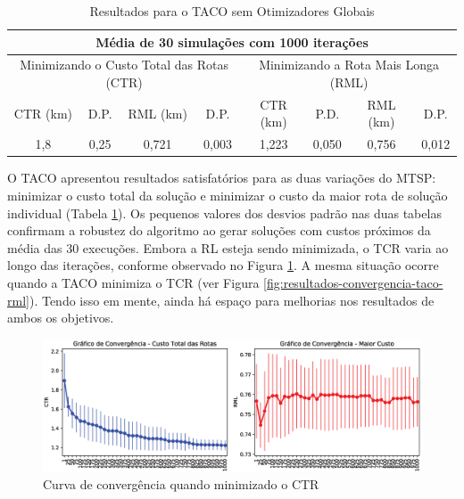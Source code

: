 \begin{table}[htb]
    \centering
    \caption{Resultados para o TACO sem Otimizadores Globais} \label{tab:resultado-taco}
\begin{tabular}{|c|c|c|c|c|c|c|c|}
\hline
\multicolumn{8}{|c|}{Média de 30 simulações com 1000 iterações}                                                            \\ \hline
\multicolumn{4}{|c|}{Minimizando o Custo Total das Rotas (CTR)} & \multicolumn{4}{c|}{Minimizando a Rota Mais Longa (RML)} \\ \hline
CTR (km)    & D.P.  & RML (km)  & D.P.      & CTR (km)  & P.D.      & RML (km)  & D.P.        \\ \hline
1,8         & 0,25  & 0,721     & 0,003     & 1,223     & 0,050     & 0,756     & 0,012       \\ \hline
\end{tabular}
\end{table}

O TACO apresentou resultados satisfatórios para as duas variações do MTSP: minimizar o custo total da solução e minimizar o custo da maior rota de solução individual (Tabela \ref{tab:resultado-taco}). Os pequenos valores dos desvios padrão nas duas tabelas confirmam a robustez do algoritmo ao gerar soluções com custos próximos da média das 30 execuções. Embora a RL esteja sendo minimizada, o TCR varia ao longo das iterações, conforme observado no Figura \ref{fig:resultados-convergencia-taco-tcr}. A mesma situação ocorre quando a TACO minimiza o TCR (ver Figura \ref{fig:resultados-convergencia-taco-rml}). Tendo isso em mente, ainda há espaço para melhorias nos resultados de ambos os objetivos.

\begin{figure}[htb]
    \centering
    \caption{Curva de convergência quando minimizado o CTR} \label{fig:resultados-convergencia-taco-tcr}
    \includegraphics[width=\textwidth]{imagens/convergence-totalcost-taco.eps}
    \end{figure}

